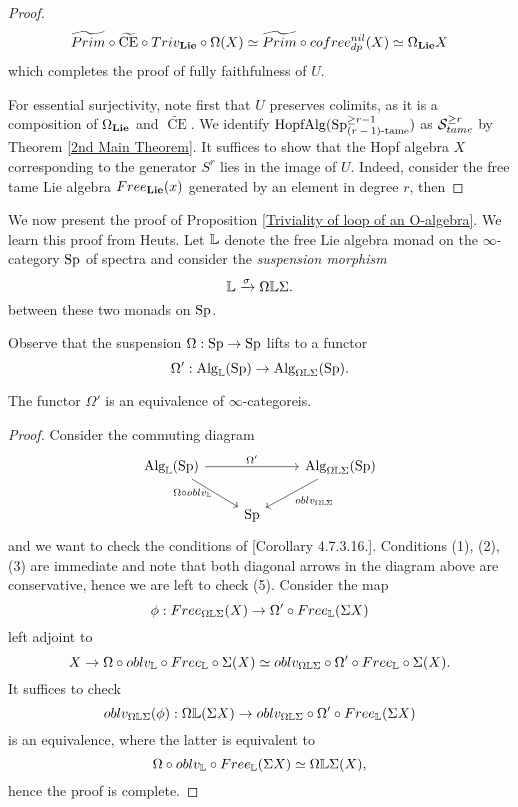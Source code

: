 \begin{proof}
	$$
	\widetilde{Prim}\circ \widetilde{\operatorname{CE}} \circ 
	Triv_{\mathbf{Lie}}\circ \Omega(X)  \simeq   \widetilde{Prim}\circ cofree^{nil}_{dp}(X)
	\simeq  \Omega_{\mathbf{Lie}}X
	$$
	which completes the proof of fully faithfulness of $U$.

    For essential surjectivity, note first that  $U$ preserves colimits, as it is a composition of $\Omega_{\mathbf{Lie}}$ and $\widetilde{\operatorname{CE}}$. 
    We identify $\operatorname{HopfAlg}(\operatorname{Sp}^{\geq r-1}_{\text{($r-1$)-tame}})$ as ${\mathcal{S}}^{\geq r}_{tame}$ by Theorem \ref{2nd Main Theorem}. 
    It suffices to show that the Hopf algebra $X$ corresponding to the generator $S^r$ lies in the image of $U$. Indeed, consider the free tame Lie algebra $Free_{\mathbf{Lie}}(x)$ generated by an element in degree $r$, then 
\end{proof}

We now present the proof of Proposition \ref{Triviality of loop of an O-algebra}.
We learn this proof from Heuts. 
Let ${\mathbb{L}}$ denote the free Lie algebra monad on the $\infty$-category $\operatorname{Sp}$ of spectra and consider the 
\emph{suspension morphism}
\[
{\mathbb{L}} \xrightarrow{\sigma} \Omega {\mathbb{L}} \Sigma.
\]
between these two monads on $\operatorname{Sp}$.

Observe that the suspension $\Omega:\operatorname{Sp} \to \operatorname{Sp}$ lifts to a functor 
$$
\Omega':  \operatorname{Alg}_{{\mathbb{L}}}(\operatorname{Sp}) \to \operatorname{Alg}_{\Omega {\mathbb{L}} \Sigma}(\operatorname{Sp}).
$$
\begin{lemma}
	The functor $\Omega'$ is an equivalence of $\infty$-categoreis.
\end{lemma}
\begin{proof}
	Consider the commuting diagram
\[
\begin{tikzcd}
	\Alg_{\BL }(\Sp)  &   & \Alg_{ \Omega \BL \Sigma}(\Sp) \\
	& \Sp &
	\arrow[from=1-1, to = 1-3, "\Omega'"]
	\arrow[from=1-1 , to =2-2, "\Omega\circ \oblv_{\BL}" left]
	\arrow[from=1-3, to=2-2, "\oblv_{\Omega\BL\Sigma}"]
\end{tikzcd}
\]
and we want to check the conditions of \cite{HA}[Corollary 4.7.3.16.].
Conditions (1), (2), (3) are immediate and note that both diagonal arrows in the diagram above are conservative, hence we are left to check (5).
Consider the map
\[
\phi: Free_{\Omega{\mathbb{L}}\Sigma}(X) \to \Omega' 
\circ Free_{{\mathbb{L}}} (\Sigma X)
\]
left adjoint to
\[
X \to \Omega \circ oblv_{{\mathbb{L}}}\circ
Free_{{\mathbb{L}}}
\circ
\Sigma(X)
\simeq 
oblv_{\Omega {\mathbb{L}} \Sigma}
\circ
\Omega'\circ Free_{{\mathbb{L}}}\circ \Sigma (X).
\]
It suffices to check 
\[
oblv_{\Omega{\mathbb{L}}\Sigma}(\phi):
\Omega {\mathbb{L}}(\Sigma X) \to 
oblv_{\Omega{\mathbb{L}}\Sigma} \circ \Omega'\circ Free_{{\mathbb{L}}} (\Sigma X)
\]
is an equivalence, where the latter is equivalent to 
$$
\Omega \circ oblv_{{\mathbb{L}}}\circ Free_{{\mathbb{L}}}(\Sigma X)\simeq \Omega {\mathbb{L}} \Sigma(X),
$$
hence the proof is complete.
\end{proof}

